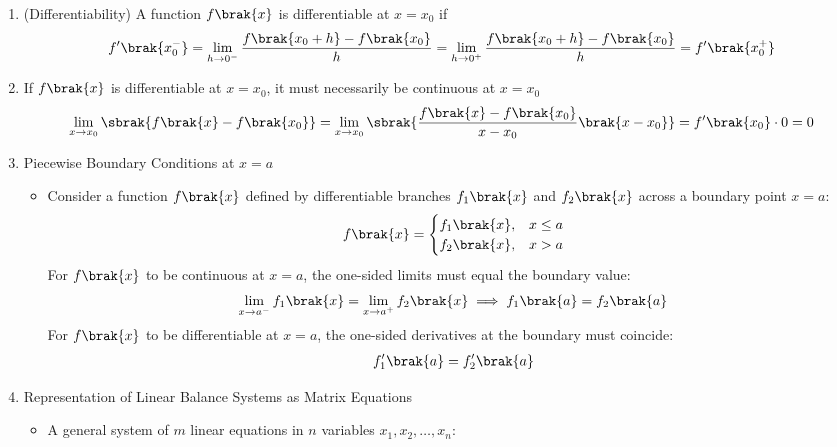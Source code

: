 \begin{enumerate}[label=\thesubsection.\arabic*, ref=\thesubsection.\theenumi,itemsep=0pt]
\begin{align}
\lim_{x \to x_0^-} f\brak{x} = \lim_{x \to x_0^+} f\brak{x} = f\brak{x_0} \label{eq:EE26BTECH11213-continuity_cond}
\end{align}
\item (Differentiability) 
A function $f\brak{x}$ is differentiable at $x = x_0$ if
\begin{align}
f'\brak{x_0^-} = \lim_{h \to 0^-} \frac{f\brak{x_0 + h} - f\brak{x_0}}{h} = \lim_{h \to 0^+} \frac{f\brak{x_0 + h} - f\brak{x_0}}{h} = f'\brak{x_0^+} 
\label{eq:EE26BTECH11213-deriv_equality}
\end{align}
\item 
If $f\brak{x}$ is differentiable at $x = x_0$, it must necessarily be continuous at $x = x_0$
\begin{align}
\lim_{x \to x_0} \sbrak{f\brak{x} - f\brak{x_0}} = \lim_{x \to x_0} \sbrak{\frac{f\brak{x} - f\brak{x_0}}{x - x_0} \brak{x - x_0}} = f'\brak{x_0} \cdot 0 = 0 \label{eq:EE26BTECH11213-diff_implies_cont}
\end{align}
%
\item Piecewise Boundary Conditions at $x = a$
\begin{itemize}
\item Consider a function $f\brak{x}$ defined by differentiable branches $f_1\brak{x}$ and $f_2\brak{x}$ across a boundary point $x = a$:
\begin{align}
f\brak{x} = \begin{cases}
f_1\brak{x}, & x \le a \\
f_2\brak{x}, & x > a
\end{cases} \label{eq:EE26BTECH11213-piecewise_branches}
\end{align}
For $f\brak{x}$ to be continuous at $x = a$, the one-sided limits must equal the boundary value:
\begin{align}
\lim_{x \to a^-} f_1\brak{x} = \lim_{x \to a^+} f_2\brak{x} \implies f_1\brak{a} = f_2\brak{a} \label{eq:EE26BTECH11213-piecewise_cont_cond}
\end{align}
For $f\brak{x}$ to be differentiable at $x = a$, the one-sided derivatives at the boundary must coincide:
\begin{align}
f_1'\brak{a} = f_2'\brak{a} \label{eq:EE26BTECH11213-piecewise_diff_cond}
\end{align}
\end{itemize}
\iffalse
\item Representation of Linear Balance Systems as Matrix Equations
\begin{itemize}
\item A general system of $m$ linear equations in $n$ variables $x_1, x_2, \dots, x_n$:

\end{itemize}
\end{enumerate}

